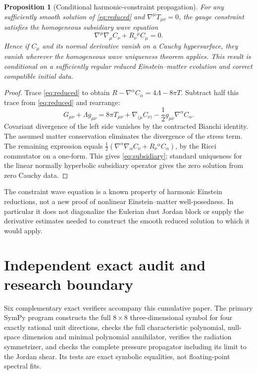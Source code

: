 \documentclass[11pt,a4paper]{article}
\newtheorem{proposition}{Proposition}
\begin{document}
\begin{proposition}[Conditional harmonic-constraint propagation]
\label{prop:constraint}
For any sufficiently smooth solution of
\eqref{eq:reduced} and
$\nabla^\mu T_{\mu\nu}=0$, the gauge
constraint satisfies the homogeneous
subsidiary wave equation
\begin{equation}\label{eq:subsidiary}
\boxed{\quad
\nabla^\mu\nabla_\mu C_\nu+
R_\nu{}^\mu C_\mu=0.
\quad}
\end{equation}
Hence if $C_\mu$ and its normal derivative
vanish on a Cauchy hypersurface, they vanish
wherever the homogeneous wave uniqueness
theorem applies. This result is \emph{conditional}
on a sufficiently regular reduced
Einstein--matter evolution and
correct compatible initial data.
\end{proposition}
\begin{proof}
Trace \eqref{eq:reduced} to obtain
$R-\nabla^\alpha C_\alpha
=4\Lambda-8\pi T$.
Subtract half this trace from
\eqref{eq:reduced} and rearrange:
\[
G_{\mu\nu}+\Lambda g_{\mu\nu}
=8\pi T_{\mu\nu}
+\nabla_{(\mu}C_{\nu)}
-\frac12g_{\mu\nu}\nabla^\alpha C_\alpha .
\]
Covariant divergence of the left side
vanishes by the contracted Bianchi identity.
The assumed matter conservation eliminates
the divergence of the stress term. The remaining
expression equals
$\tfrac12(\nabla^\alpha\nabla_\alpha C_\nu+
R_\nu{}^\alpha C_\alpha)$,
by the Ricci commutator on a one-form.
This gives \eqref{eq:subsidiary};
standard uniqueness for the linear
normally hyperbolic subsidiary operator
gives the zero solution from zero Cauchy data.
\end{proof}

The constraint wave equation is a known
property of harmonic Einstein reductions,
not a new proof of nonlinear
Einstein--matter well-posedness.
In particular it does not diagonalize
the Eulerian dust Jordan block or
supply the derivative estimates needed
to construct the smooth reduced
solution to which it would apply.

\section{Independent exact audit and research boundary}
Six complementary exact verifiers accompany
this cumulative paper. The primary SymPy program
constructs the full $8\times8$ three-dimensional
symbol for four exactly rational unit
directions, checks the full characteristic
polynomial, null-space dimension and
minimal polynomial annihilator,
verifies the radiation symmetrizer,
and checks the complete pressure
propagator including its limit to the
Jordan shear. Its tests are exact
symbolic equalities, not floating-point
spectral fits.
\end{document}
